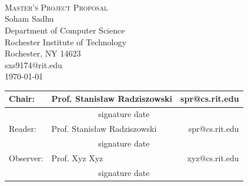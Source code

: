 \documentclass[12pt]{artikel3}                  %
\begin{document}
\begin{titlepage}
\begin{center}

\textsc{\LARGE }\\[0.2cm]
\textsc{\LARGE }\\[0.2cm]
\textsc{\LARGE }\\[1.2cm]

\textsc{\Large Master's Project Proposal}\\[1cm]

\large{Soham Sadhu}\\
\large{Department of Computer Science}\\
\large{Rochester Institute of Technology}\\
\large{Rochester, NY 14623}\\
\large{sxs9174@rit.edu}\\[0.5cm]

{\large \today}\\[1cm]

\begin{tabular}{l l r}
    Chair: & Prof. Stanis{\l}aw Radziszowski & spr@cs.rit.edu\\[1.5cm] \hline
    \multicolumn{3}{c}{signature \hspace{6cm} date}\\[1cm]
    Reader: & Prof. Stanis{\l}aw Radziszowski & spr@cs.rit.edu\\[1.5cm] \hline
    \multicolumn{3}{c}{signature \hspace{6cm} date}\\[1cm]
    Observer: & Prof. Xyz Xyz & xyz@cs.rit.edu\\[1.5cm] \hline
    \multicolumn{3}{c}{signature \hspace{6cm} date}\\[1cm]
\end{tabular}


\vfill

\end{center}
\end{titlepage}
\end{document}
